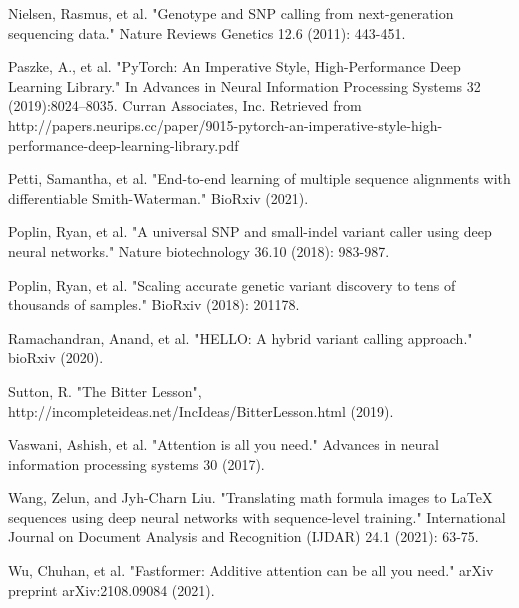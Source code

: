 \documentclass[]{article}
\begin{document}
\vspace{8pt}
Nielsen, Rasmus, et al. "Genotype and SNP calling from next-generation sequencing data." Nature Reviews Genetics 12.6 (2011): 443-451.

\vspace{8pt}
Paszke, A., et al. "PyTorch: An Imperative Style, High-Performance Deep Learning Library." In Advances in Neural Information Processing Systems 32 (2019):8024–8035. Curran Associates, Inc. Retrieved from http://papers.neurips.cc/paper/9015-pytorch-an-imperative-style-high-performance-deep-learning-library.pdf

\vspace{8pt}
Petti, Samantha, et al. "End-to-end learning of multiple sequence alignments with differentiable Smith-Waterman." BioRxiv (2021).

\vspace{8pt}
Poplin, Ryan, et al. "A universal SNP and small-indel variant caller using deep neural networks." Nature biotechnology 36.10 (2018): 983-987.

\vspace{8pt}
Poplin, Ryan, et al. "Scaling accurate genetic variant discovery to tens of thousands of samples." BioRxiv (2018): 201178.

\vspace{8pt}
Ramachandran, Anand, et al. "HELLO: A hybrid variant calling approach." bioRxiv (2020).
 
\vspace{8pt}
Sutton, R. "The Bitter Lesson", http://incompleteideas.net/IncIdeas/BitterLesson.html (2019).

\vspace{8pt}
Vaswani, Ashish, et al. "Attention is all you need." Advances in neural information processing systems 30 (2017).

\vspace{8pt}
Wang, Zelun, and Jyh-Charn Liu. "Translating math formula images to LaTeX sequences using deep neural networks with sequence-level training." International Journal on Document Analysis and Recognition (IJDAR) 24.1 (2021): 63-75.

\vspace{8pt}
Wu, Chuhan, et al. "Fastformer: Additive attention can be all you need." arXiv preprint arXiv:2108.09084 (2021).
\end{document}
